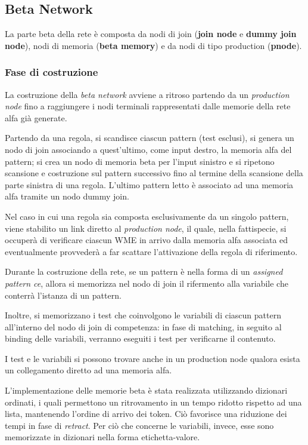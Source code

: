 \subsection{Beta Network}
La parte beta della rete è composta da nodi di join (\textbf{join node} e \textbf{dummy join node}), nodi di memoria (\textbf{beta memory}) e da nodi di tipo production (\textbf{pnode}).

\subsubsection{Fase di costruzione}
La costruzione della \emph{beta network} avviene a ritroso partendo da un \emph{production node} fino a raggiungere i nodi terminali rappresentati dalle memorie della rete alfa già generate.

Partendo da una regola, si scandisce ciascun pattern (test esclusi), si genera un nodo di join associando a quest'ultimo, come input destro, la memoria alfa del pattern; si crea un nodo di memoria beta per l'input sinistro e si ripetono scansione e costruzione sul pattern successivo fino al termine della scansione della parte sinistra di una regola.
L'ultimo pattern letto è associato ad una memoria alfa tramite un nodo dummy join.

Nel caso in cui una regola sia composta esclusivamente da un singolo pattern, viene stabilito un link diretto al \emph{production node}, il quale, nella fattispecie, si occuperà di verificare ciascun WME in arrivo dalla memoria alfa associata ed eventualmente provvederà a far scattare l'attivazione della regola di riferimento. 

Durante la costruzione della rete, se un pattern è nella forma di un \emph{assigned pattern ce}, allora si memorizza nel nodo di join il rifermento alla variabile che conterrà l'istanza di un pattern.

Inoltre, si memorizzano i test che coinvolgono le variabili di ciascun pattern all'interno del nodo di join di competenza: in fase di matching, in seguito al binding delle variabili, verranno eseguiti i test per verificarne il contenuto.

I test e le variabili si possono trovare anche in un production node qualora esista un collegamento diretto ad una memoria alfa.

L'implementazione delle memorie beta è stata realizzata utilizzando dizionari ordinati, i quali permettono un ritrovamento in un tempo ridotto rispetto ad una lista, mantenendo l'ordine di arrivo dei token. Ciò favorisce una riduzione dei tempi in fase di \emph{retract}. Per ciò che concerne le variabili, invece, esse sono memorizzate in dizionari nella forma etichetta-valore.


